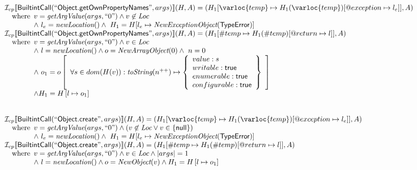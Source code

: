 \[\begin{array}{l}
\I _{cp}\lbr \SF{BuiltintCall}(``\SF{Object.getOwnPropertyNames}",args)\rbr(H,A)
 = (H_1[\varloc{temp}\mapsto H_1(\varloc{temp})[\varprop{exception}\mapsto l_{e}]], A) \\
\quad\wherec{
  v = \hf{getArgValue}(args, ``0") \land v\not\in\Loc\\
  \land\ l_e = \hf{newLocation}() \land\ H_1=H[l_e\mapsto\hf{NewExceptionObject}(\SF{TypeError})] }\\

\I _{cp}\lbr \SF{BuiltintCall}(``\SF{Object.getOwnPropertyNames}",args)\rbr(H,A)
 = (H_1[\#temp \mapsto H_1(\#temp)[@return \mapsto l]], A)\\
  \quad\wherec{
  v = \hf{getArgValue}(args, ``0") \land v \in\Loc\\
  \land\ l=\hf{newLocation}() \land o=\hf{NewArrayObject}(0) \land\ n = 0\\
  \land\ o_1 = o\left[
    \begin{array}{l}
      \forall s \in dom(H(v)): 
      \hf{toString}(n^{++}) \mapsto \left\{
        \begin{array}{l}
          value: s\\
          writable: \SF{true} \\
          enumerable: \SF{true}\\
          configurable: \SF{true} \\
        \end{array}
        \right\}\\
    \end{array}\right]\\
  \land H_1=H\left[l\mapsto o_1\right]}\\
\\\\



\I _{cp}\lbr \SF{BuiltintCall}(``\SF{Object.create}",args)\rbr(H,A)
 = (H_1[\varloc{temp}\mapsto H_1(\varloc{temp})[\varprop{exception}\mapsto l_{e}]], A) \\
\quad\wherec{
  v = \hf{getArgValue}(args, ``0") \land (v\not\in\Loc \lor v \in \{\SF{null}\})\\
  \land\ l_e = \hf{newLocation}() \land\ H_1=H[l_e\mapsto\hf{NewExceptionObject}(\SF{TypeError})] }\\

\I _{cp}\lbr \SF{BuiltintCall}(``\SF{Object.create}",args)\rbr(H,A)
 = (H_1[\#temp \mapsto H_1(\#temp)[@return \mapsto l]], A)\\
\quad\wherec{
  v = \hf{getArgValue}(args, ``0") \land v \in\Loc \land |args| = 1 \\
  \land\ l=\hf{newLocation}() \land o=\hf{NewObject}(v)
  \land H_1 = H\left[l\mapsto o_1\right]}\\


\end{array}\]
